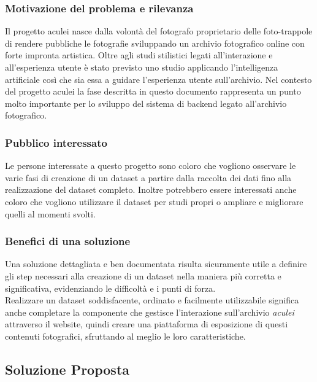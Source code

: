\documentclass[12pt,a4paper,twoside]{article}
\begin{document}
\subsubsection{Motivazione del problema e rilevanza}
Il progetto aculei nasce dalla volontà del fotografo proprietario delle foto-trappole di rendere pubbliche 
le fotografie sviluppando un archivio fotografico online con forte impronta artistica. Oltre agli studi 
stilistici legati all'interazione e all'esperienza utente è stato previsto uno studio applicando 
l'intelligenza artificiale così che sia essa a guidare l'esperienza utente sull'archivio. Nel contesto del 
progetto aculei la fase descritta in questo documento rappresenta un punto molto importante per lo sviluppo 
del sistema di backend legato all'archivio fotografico.

\subsubsection{Pubblico interessato}
Le persone interessate a questo progetto sono coloro che vogliono osservare le varie fasi di creazione 
di un dataset a partire dalla raccolta dei dati fino alla realizzazione del dataset completo. Inoltre 
potrebbero essere interessati anche coloro che vogliono utilizzare il dataset per studi propri o ampliare 
e migliorare quelli al momenti svolti.

\subsubsection{Benefici di una soluzione}
Una soluzione dettagliata e ben documentata risulta sicuramente utile a definire gli step necessari alla 
creazione di un dataset nella maniera più corretta e significativa, evidenziando le difficoltà e i punti 
di forza.\\
Realizzare un dataset soddisfacente, ordinato e facilmente utilizzabile significa anche completare la 
componente che gestisce l'interazione sull'archivio \textit{aculei} attraverso il website, quindi 
creare una piattaforma di esposizione di questi contenuti fotografici, sfruttando al meglio le loro 
caratteristiche. 


\subsection{Soluzione Proposta}
\end{document}
